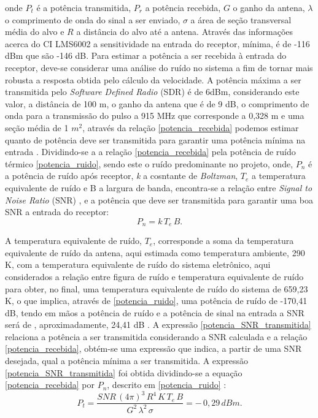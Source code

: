 onde $P_t$ é a potência transmitida, $P_r$ a potência recebida, $G$ o ganho da antena, $\lambda$ o comprimento de onda do sinal a ser enviado, $\sigma$ a área de seção transversal média do alvo e $R$ a distância do alvo até a antena.
Através das informações acerca do CI LMS6002 a sensitividade na entrada do receptor, mínima, é de -116 dBm que são -146 dB. Para estimar a potência a ser recebida à entrada do receptor, deve-se considerar uma análise do ruído no sistema a fim de tornar mais robusta a resposta obtida pelo cálculo da velocidade.
A potência máxima a ser transmitida pelo  \emph{Software Defined Radio} (SDR) é de 6dBm, considerando este valor, a distância de 100 m, o ganho da antena que é de 9 dB, o comprimento de onda para a transmissão do pulso a 915 MHz que corresponde a 0,328 m e uma seção média de 1 $m^2$, através da relação \ref{potencia_recebida} podemos estimar quanto de potência deve ser transmitida para garantir uma potência mínima na entrada \cite{richards}.
Dividindo-se a a relação \ref{potencia_recebida} pela potência de ruído térmico \ref{potencia_ruido}, sendo este o ruído predominante no projeto, onde, $P_n$ é a potência de ruído após receptor, \emph{k} a cosntante de \emph{Boltzman}, $T_e$ a temperatura equivalente de ruído e B a largura de banda, encontra-se a relação entre \emph{Signal to Noise Ratio} (SNR) \cite{vasilescu}, e a potência que deve ser transmitida para garantir uma boa SNR a entrada do receptor:
\begin{equation}\label{potencia_ruido}
    P_n = k\, T_e\,B.
\end{equation}

A temperatura equivalente de ruído, $T_e$, corresponde a soma da temperatura equivalente de ruído da antena, aqui estimada como temperatura ambiente, 290 K, com a temperatura equivalente de ruído do sistema eletrônico, aqui considerados a relação entre figura de ruído e temperatura equivalente de ruído para obter, no final, uma temperatura equivalente de ruído do sistema de 659,23 K, o que implica, através de \ref{potencia_ruido}, uma potência de ruído de -170,41 dB, tendo em mãos a potência de ruído e a potência de sinal na entrada a SNR será de , aproximadamente, 24,41 dB .
A expressão \ref{potencia_SNR_transmitida} relaciona a potência a ser transmitida considerando a SNR calculada e a relação \ref{potencia_recebida}, obtém-se uma expressão que indica, a partir de uma SNR desejada, qual a potência mínima a ser transmitida. A expressão \ref{potencia_SNR_transmitida} foi obtida dividindo-se a equação \ref{potencia_recebida} por $P_n$, descrito em \ref{potencia_ruido}  \cite{richards}:
\begin{equation}\label{potencia_SNR_transmitida}
    P_t = \frac{ SNR\,(4\pi)^{3}\,R^{4}\,K\,T_e\,B}{G^{2}\,   \lambda^{2}\, \sigma }  = -\,0,29\,dBm.
\end{equation}
